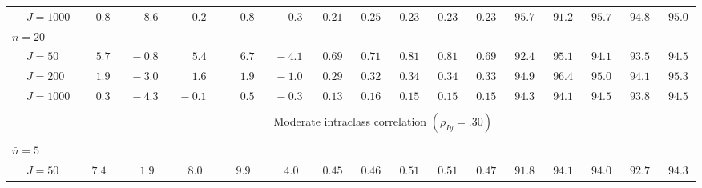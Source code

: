 \begin{sidewaystable}
\begin{threeparttable}
\begin{tabular}{llccccccccccccccc}
 & \nopagebreak $\;J=1000$  & $\phantom{0}\phantom{-}0.8\phantom{0}$ & $\phantom{0}{-}8.6\phantom{0}$ & $\phantom{0}\phantom{-}0.2\phantom{0}$ & $\phantom{0}\phantom{-}0.8\phantom{0}$ & $\phantom{0}{-}0.3\phantom{0}$ & $\phantom{0}0.21\phantom{0}$ & $\phantom{0}0.25\phantom{0}$ & $\phantom{0}0.23\phantom{0}$ & $\phantom{0}0.23\phantom{0}$ & $\phantom{0}0.23\phantom{0}$ & $\phantom{0}95.7\phantom{0}$ & $\phantom{0}91.2\phantom{0}$ & $\phantom{0}95.7\phantom{0}$ & $\phantom{0}94.8\phantom{0}$ & $\phantom{0}95.0\phantom{0}$ \\
\multicolumn{4}{l}{$\bar{n}=20$} \\  & \nopagebreak $\;J=50$  & $\phantom{0}\phantom{-}5.7\phantom{0}$ & $\phantom{0}{-}0.8\phantom{0}$ & $\phantom{0}\phantom{-}5.4\phantom{0}$ & $\phantom{0}\phantom{-}6.7\phantom{0}$ & $\phantom{0}{-}4.1\phantom{0}$ & $\phantom{0}0.69\phantom{0}$ & $\phantom{0}0.71\phantom{0}$ & $\phantom{0}0.81\phantom{0}$ & $\phantom{0}0.81\phantom{0}$ & $\phantom{0}0.69\phantom{0}$ & $\phantom{0}92.4\phantom{0}$ & $\phantom{0}95.1\phantom{0}$ & $\phantom{0}94.1\phantom{0}$ & $\phantom{0}93.5\phantom{0}$ & $\phantom{0}94.5\phantom{0}$ \\
 & \nopagebreak $\;J=200$  & $\phantom{0}\phantom{-}1.9\phantom{0}$ & $\phantom{0}{-}3.0\phantom{0}$ & $\phantom{0}\phantom{-}1.6\phantom{0}$ & $\phantom{0}\phantom{-}1.9\phantom{0}$ & $\phantom{0}{-}1.0\phantom{0}$ & $\phantom{0}0.29\phantom{0}$ & $\phantom{0}0.32\phantom{0}$ & $\phantom{0}0.34\phantom{0}$ & $\phantom{0}0.34\phantom{0}$ & $\phantom{0}0.33\phantom{0}$ & $\phantom{0}94.9\phantom{0}$ & $\phantom{0}96.4\phantom{0}$ & $\phantom{0}95.0\phantom{0}$ & $\phantom{0}94.1\phantom{0}$ & $\phantom{0}95.3\phantom{0}$ \\
 & \nopagebreak $\;J=1000$  & $\phantom{0}\phantom{-}0.3\phantom{0}$ & $\phantom{0}{-}4.3\phantom{0}$ & $\phantom{0}{-}0.1\phantom{0}$ & $\phantom{0}\phantom{-}0.5\phantom{0}$ & $\phantom{0}{-}0.3\phantom{0}$ & $\phantom{0}0.13\phantom{0}$ & $\phantom{0}0.16\phantom{0}$ & $\phantom{0}0.15\phantom{0}$ & $\phantom{0}0.15\phantom{0}$ & $\phantom{0}0.15\phantom{0}$ & $\phantom{0}94.3\phantom{0}$ & $\phantom{0}94.1\phantom{0}$ & $\phantom{0}94.5\phantom{0}$ & $\phantom{0}93.8\phantom{0}$ & $\phantom{0}94.5\phantom{0}$ \\
[0.5ex]\hline\\[-1.6ex] 
& & \multicolumn{15}{c}{Moderate intraclass correlation $(\rho_{Iy}=.30)$} \\[0.6ex]\hline\\[-1.8ex]
\multicolumn{4}{l}{$\bar{n}=5$} \\  & \nopagebreak $\;J=50$  & $\phantom{-}7.4\phantom{0}$ & $\phantom{-}1.9\phantom{0}$ & $\phantom{-}8.0\phantom{0}$ & $\phantom{-}9.9\phantom{0}$ & $\phantom{-}4.0\phantom{0}$ & $\phantom{0}0.45\phantom{0}$ & $\phantom{0}0.46\phantom{0}$ & $\phantom{0}0.51\phantom{0}$ & $\phantom{0}0.51\phantom{0}$ & $\phantom{0}0.47\phantom{0}$ & $\phantom{0}91.8\phantom{0}$ & $\phantom{0}94.1\phantom{0}$ & $\phantom{0}94.0\phantom{0}$ & $\phantom{0}92.7\phantom{0}$ & $\phantom{0}94.3\phantom{0}$ \\

\end{tabular}
\end{threeparttable}
\end{sidewaystable}
